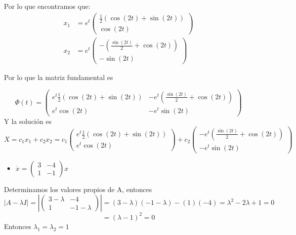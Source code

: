 Por lo que encontramos que: 
\begin{equation*}
    \begin{split}
        x_{1}&=e^{t}\begin{pmatrix}
\frac{1}{2}(\cos{(2t)}+ \sin{(2t)}) \\
\cos{(2t)}
\end{pmatrix} \\
x_{2}&= e^{t} \begin{pmatrix}
-(\frac{\sin{(2t)}}{2} + \cos{(2t)}) \\
-\sin{(2t)}
\end{pmatrix}
    \end{split}
\end{equation*}

Por lo que la matriz fundamental es 

\begin{equation*}
    \Phi(t)= \begin{pmatrix}
e^{t}\frac{1}{2}(\cos{(2t)}+ \sin{(2t)}) & -e^{t}(\frac{\sin{(2t)}}{2} + \cos{(2t)}) \\
e^{t}\cos{(2t)} & -e^{t}\sin{(2t)}
\end{pmatrix}
\end{equation*}
Y la solución es 
\begin{equation*}
    X=c_{1}x_{1} + c_{2}x_{2} = c_{1}\begin{pmatrix}
    e^{t}\frac{1}{2}(\cos{(2t)}+ \sin{(2t)}) \\
    e^{t}\cos{(2t)}
    \end{pmatrix} + c_{2} \begin{pmatrix}
    -e^{t}(\frac{\sin{(2t)}}{2} + \cos{(2t)}) \\
    -e^{t}\sin{(2t)}
    \end{pmatrix}
\end{equation*}
\newpage
\begin{itemize}
    \item $\dot x=\begin{pmatrix}
    3 & -4 \\
    1 & -1
    \end{pmatrix}x$
\end{itemize}
Determinamos los valores propios de A, entonces
\begin{equation*}
    |A - \lambda I| = 
|\begin{pmatrix}
3 - \lambda & -4\\
1 & -1 - \lambda
\end{pmatrix}| 
= (3 - \lambda)(-1 - \lambda)-(1)(-4)= \lambda^{2}-2\lambda+1 = 0
\end{equation*}
\begin{equation*}
    = (\lambda - 1 )^{2}= 0
\end{equation*}
Entonces $\lambda_{1}=\lambda_{2}=1$ \\

